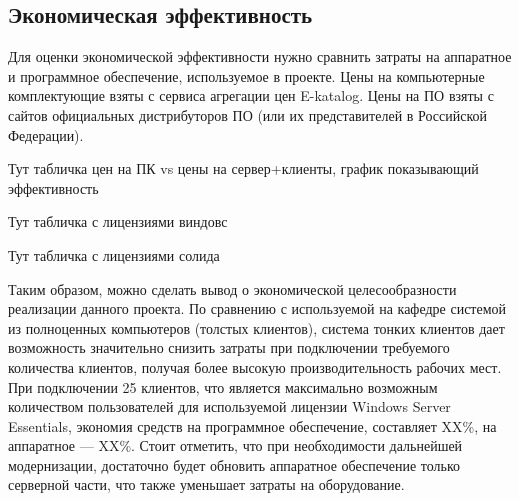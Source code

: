 \subsection{Экономическая эффективность}

Для оценки экономической эффективности нужно сравнить затраты на аппаратное и
программное обеспечение, используемое в проекте. Цены на компьютерные комплектующие 
взяты с сервиса агрегации цен E-katalog. Цены на ПО взяты с сайтов официальных
дистрибуторов ПО (или их представителей в Российской Федерации).

Тут табличка цен на ПК vs цены на сервер+клиенты, график показывающий эффективность

Тут табличка с лицензиями виндовс

Тут табличка с лицензиями солида

Таким образом, можно сделать вывод о экономической целесообразности реализации данного
проекта. По сравнению с используемой на кафедре системой из полноценных компьютеров
(толстых клиентов), система тонких клиентов дает возможность значительно снизить затраты
при подключении требуемого количества клиентов, получая более высокую производительность
рабочих мест.
При подключении 25 клиентов, что является максимально возможным количеством
пользователей для используемой лицензии Windows Server Essentials, экономия средств на
программное обеспечение, составляет XX\%, на аппаратное — XX\%. Стоит отметить, что при
необходимости дальнейшей модернизации, достаточно будет обновить аппаратное обеспечение
только серверной части, что также уменьшает затраты на оборудование.
